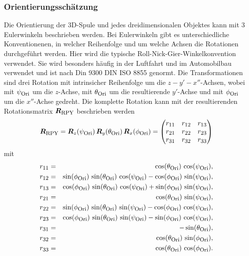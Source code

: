 	\subsubsection{Orientierungsschätzung}
	Die Orientierung der 3D-Spule und jedes dreidimensionalen Objektes kann mit 3 Eulerwinkeln beschrieben werden. Bei Eulerwinkeln gibt es unterschiedliche Konventionenen, in welcher Reihenfolge und um welche Achsen die Rotationen durchgeführt werden. Hier wird die typische Roll-Nick-Gier-Winkelkonvention verwendet. Sie wird besonders häufig in der Luftfahrt und im Automobilbau verwendet und ist nach Din 9300 DIN ISO 8855 genormt. Die Transformationen sind drei Rotation mit intrinsicher Reihenfolge um die $z-y'-x''$-Achsen, wobei mit $\psi_{\textrm{\footnotesize{Ori}}}$ um die $z$-Achse, mit $\theta_{\textrm{\footnotesize{Ori}}}$ um die resultierende $y'$-Achse und mit $\phi_{\textrm{\footnotesize{Ori}}}$ um die $x''$-Achse gedreht. Die komplette Rotation kann mit der resultierenden Rotationsmatrix $\mbox{\boldmath ${R}$}_{\textrm{\footnotesize{RPY}}}$ beschrieben werden
    \begin{equation}
        \mbox{\boldmath ${R}$}_{\textrm{\footnotesize{RPY}}} = \mbox{\boldmath ${R}$}_{z}(\psi_{\textrm{\footnotesize{Ori}}}) \, \mbox{\boldmath ${R}$}_{y}(\theta_{\textrm{\footnotesize{Ori}}})\, \mbox{\boldmath ${R}$}_{x}(\phi_{\textrm{\footnotesize{Ori}}})= \begin{pmatrix}
            r_{\textrm{\footnotesize{11}}} & r_{\textrm{\footnotesize{12}}} & r_{\textrm{\footnotesize{13}}}\\
            r_{\textrm{\footnotesize{21}}} & r_{\textrm{\footnotesize{22}}} & r_{\textrm{\footnotesize{23}}}\\
            r_{\textrm{\footnotesize{31}}} & r_{\textrm{\footnotesize{32}}} & r_{\textrm{\footnotesize{33}}}
            \end{pmatrix}
    \end{equation}
    mit 
    \begin{eqnarray}
        r_{\textrm{\footnotesize{11}}} &=& \cos(\theta_{\textrm{\footnotesize{Ori}}})\,\cos(\psi_{\textrm{\footnotesize{Ori}}}),\nonumber\\
        r_{\textrm{\footnotesize{12}}} &=& \sin(\phi_{\textrm{\footnotesize{Ori}}})\,\sin(\theta_{\textrm{\footnotesize{Ori}}})\,\cos(\psi_{\textrm{\footnotesize{Ori}}})-\cos(\phi_{\textrm{\footnotesize{Ori}}})\,\sin(\psi_{\textrm{\footnotesize{Ori}}}),\nonumber\\
        r_{\textrm{\footnotesize{13}}} &=& \cos(\phi_{\textrm{\footnotesize{Ori}}})\,\sin(\theta_{\textrm{\footnotesize{Ori}}})\,\cos(\psi_{\textrm{\footnotesize{Ori}}})+\sin(\phi_{\textrm{\footnotesize{Ori}}})\,\sin(\psi_{\textrm{\footnotesize{Ori}}}),\nonumber\\
        r_{\textrm{\footnotesize{21}}} &=& \cos(\theta_{\textrm{\footnotesize{Ori}}})\,\sin(\psi_{\textrm{\footnotesize{Ori}}}),\nonumber\\
        r_{\textrm{\footnotesize{22}}} &=& \sin(\phi_{\textrm{\footnotesize{Ori}}})\,\sin(\theta_{\textrm{\footnotesize{Ori}}})\,\sin(\psi_{\textrm{\footnotesize{Ori}}})-\cos(\phi_{\textrm{\footnotesize{Ori}}})\,\cos(\psi_{\textrm{\footnotesize{Ori}}}),\nonumber\\
        r_{\textrm{\footnotesize{23}}} &=& \cos(\phi_{\textrm{\footnotesize{Ori}}})\,\sin(\theta_{\textrm{\footnotesize{Ori}}})\,\sin(\psi_{\textrm{\footnotesize{Ori}}})-\sin(\phi_{\textrm{\footnotesize{Ori}}})\,\cos(\psi_{\textrm{\footnotesize{Ori}}}),\nonumber\\
        r_{\textrm{\footnotesize{31}}} &=& -\sin(\theta_{\textrm{\footnotesize{Ori}}}),\nonumber\\
        r_{\textrm{\footnotesize{32}}} &=& \cos(\theta_{\textrm{\footnotesize{Ori}}})\,\sin(\phi_{\textrm{\footnotesize{Ori}}}),\nonumber\\
        r_{\textrm{\footnotesize{33}}} &=& \cos(\theta_{\textrm{\footnotesize{Ori}}})\,\cos(\phi_{\textrm{\footnotesize{Ori}}}).\nonumber
    \end{eqnarray}
